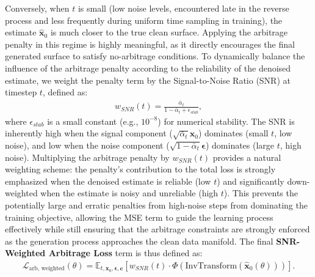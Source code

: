 \documentclass{article}
\newcommand{\eqlnostar}[2]{\begin{align}\label{#1}#2\end{align}}
\begin{document}
Conversely, when $t$ is small (low noise levels, encountered late in the reverse process and less frequently during uniform time sampling in training), the estimate $\hat{\mathbf{x}}_0$ is much closer to the true clean surface. Applying the arbitrage penalty in this regime is highly meaningful, as it directly encourages the final generated surface to satisfy no-arbitrage conditions. To dynamically balance the influence of the arbitrage penalty according to the reliability of the denoised estimate, we weight the penalty term by the Signal-to-Noise Ratio (SNR) at timestep $t$, defined as:
\eqlnostar{eq:snr_weight}{
w_{SNR}(t) = \frac{\bar{\alpha}_t}{1 - \bar{\alpha}_t + \epsilon_{stab}},
}
where $\epsilon_{stab}$ is a small constant (e.g., $10^{-8}$) for numerical stability. The SNR is inherently high when the signal component ($\sqrt{\bar{\alpha}_t} \mathbf{x}_0$) dominates (small $t$, low noise), and low when the noise component ($\sqrt{1 - \bar{\alpha}_t} \boldsymbol{\epsilon}$) dominates (large $t$, high noise). Multiplying the arbitrage penalty by $w_{SNR}(t)$ provides a natural weighting scheme: the penalty's contribution to the total loss is strongly emphasized when the denoised estimate is reliable (low $t$) and significantly down-weighted when the estimate is noisy and unreliable (high $t$). This prevents the potentially large and erratic penalties from high-noise steps from dominating the training objective, allowing the MSE term to guide the learning process effectively while still ensuring that the arbitrage constraints are strongly enforced as the generation process approaches the clean data manifold. The final \textbf{SNR-Weighted Arbitrage Loss} term is thus defined as:
\eqlnostar{eq:arb_loss_term_weighted}{
\mathcal{L}_{\text{arb, weighted}}(\theta) = \mathbb{E}_{t, \mathbf{x}_0, \boldsymbol{\epsilon}, \mathbf{c}} \left[ w_{SNR}(t) \cdot \Phi(\text{InvTransform}(\hat{\mathbf{x}}_0(\theta))) \right].
}
\end{document}

